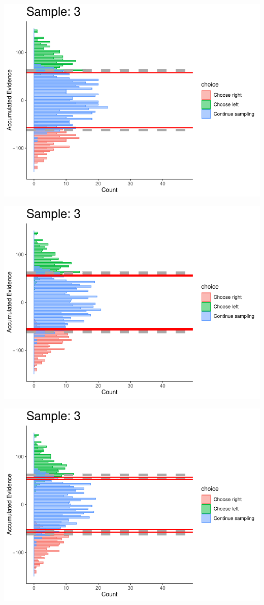 \documentclass[
]{book}
\begin{document}
\begin{center}\includegraphics[width=0.8\linewidth]{LateNightBayes_files/figure-latex/collapsing_dcb-26} \end{center}

\begin{center}\includegraphics[width=0.8\linewidth]{LateNightBayes_files/figure-latex/collapsing_dcb-27} \end{center}

\begin{center}\includegraphics[width=0.8\linewidth]{LateNightBayes_files/figure-latex/collapsing_dcb-28} \end{center}
\end{document}
